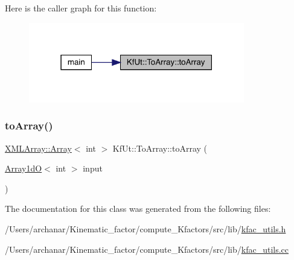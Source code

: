 Here is the caller graph for this function\+:\nopagebreak
\begin{figure}[H]
\begin{center}
\leavevmode
\includegraphics[width=267pt]{d3/dec/classKfUt_1_1ToArray_ac97892c7b8ae265fe9d91d3f823b3f98_icgraph}
\end{center}
\end{figure}
\mbox{\label{classKfUt_1_1ToArray_a272ebce4969f38835c7a503a85a4f8d3}} 
\subsubsection{\texorpdfstring{toArray()}{toArray()}\hspace{0.1cm}{\footnotesize\ttfamily [2/2]}}
{\footnotesize\ttfamily \mbox{\hyperlink{classXMLArray_1_1Array}{X\+M\+L\+Array\+::\+Array}}$<$ int $>$ Kf\+Ut\+::\+To\+Array\+::to\+Array (\begin{DoxyParamCaption}\item[{\mbox{\hyperlink{classADAT_1_1Array1dO}{Array1dO}}$<$ int $>$}]{input }\end{DoxyParamCaption})\hspace{0.3cm}{\ttfamily [static]}}



The documentation for this class was generated from the following files\+:\begin{DoxyCompactItemize}
\item 
/\+Users/archanar/\+Kinematic\+\_\+factor/compute\+\_\+\+Kfactors/src/lib/\mbox{\hyperlink{src_2lib_2kfac__utils_8h}{kfac\+\_\+utils.\+h}}\item 
/\+Users/archanar/\+Kinematic\+\_\+factor/compute\+\_\+\+Kfactors/src/lib/\mbox{\hyperlink{src_2lib_2kfac__utils_8cc}{kfac\+\_\+utils.\+cc}}\end{DoxyCompactItemize}
